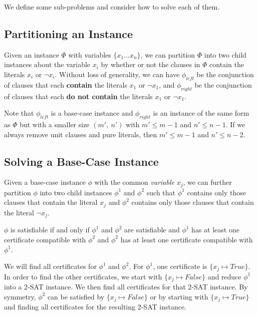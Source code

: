 We define some sub-problems and consider how to solve each of them.


\subsection{Partitioning an Instance}
\label{subsec:partitioning-an-instance}

Given an instance $\Phi$ with variables $\{ x_1 \dots x_n \}$, we can partition $\Phi$ into two child instances about the variable $x_i$ by whether or not the clauses in $\Phi$ contain the literals $x_i$ or $\lnot x_i$.
Without loss of generality, we can have $\phi_{left}$ be the conjunction of clauses that each \textbf{contain} the literals $x_1$ or $\lnot x_1$, and $\phi_{right}$ be the conjunction of clauses that each \textbf{do not contain} the literals $x_1$ or $\lnot x_1$.

Note that $\phi_{left}$ is a base-case instance and $\phi_{right}$ is an instance of the same form as $\Phi$ but with a smaller size $(m',~ n')$ with $m' \leq m - 1$ and $n' \leq n - 1$.
If we always remove unit clauses and pure literals, then $m' \leq m - 1$ and $n' \leq n - 2$.


\subsection{Solving a Base-Case Instance}
\label{subsec:solving-a-base-case-instance}

Given a base-case instance $\phi$ with the common \textit{variable} $x_j$, we can further partition $\phi$ into two child instances $\phi^1$ and $\phi^2$ such that $\phi^1$ contains only those clauses that contain the literal $x_j$ and $\phi^2$ contains only those clauses that contain the literal $\lnot x_j$.

$\phi$ is satisfiable if and only if $\phi^1$ and $\phi^2$ are satisfiable and $\phi^1$ has at least one certificate compatible with $\phi^2$ and $\phi^2$ has at least one certificate compatible with $\phi^1$.

We will find all certificates for $\phi^1$ and $\phi^2$.
For $\phi^1$, one certificate is $\{ x_j \mapsto True \}$.
In order to find the other certificates, we start with $\{ x_j \mapsto False \}$ and reduce $\phi^1$ into a 2-SAT instance.
We then find all certificates for that 2-SAT instance.
By symmetry, $\phi^2$ can be satisfied by $\{ x_j \mapsto False \}$ or by starting with $\{ x_j \mapsto True \}$ and finding all certificates for the resulting 2-SAT instance.


